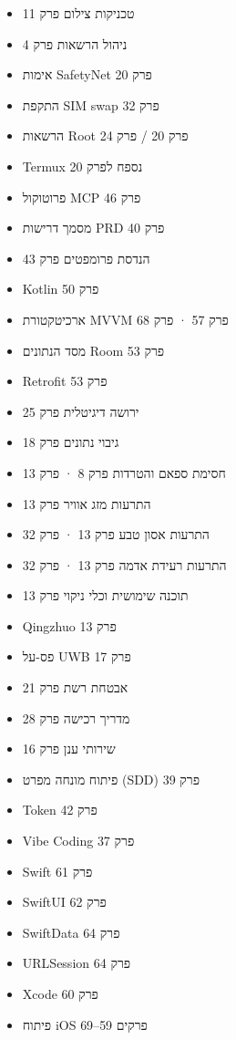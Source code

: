 
\begin{itemize}
  \item טכניקות צילום פרק 11
  \item ניהול הרשאות פרק 4
  \item אימות SafetyNet פרק 20
  \item התקפת SIM swap פרק 32
  \item הרשאות Root פרק 20 / פרק 24
  \item Termux נספח לפרק 20
  \item פרוטוקול MCP פרק 46
  \item מסמך דרישות PRD פרק 40
  \item הנדסת פרומפטים פרק 43
  \item Kotlin פרק 50
  \item ארכיטקטורת MVVM פרק 57 · פרק 68
  \item מסד הנתונים Room פרק 53
  \item Retrofit פרק 53
\end{itemize}


\begin{itemize}
  \item ירושה דיגיטלית פרק 25
  \item גיבוי נתונים פרק 18
  \item חסימת ספאם והטרדות פרק 8 · פרק 13
  \item התרעות מזג אוויר פרק 13
  \item התרעות אסון טבע פרק 13 · פרק 32
  \item התרעות רעידת אדמה פרק 13 · פרק 32
  \item תוכנה שימושית וכלי ניקוי פרק 13
  \item Qingzhuo פרק 13
  \item פס-על UWB פרק 17
  \item אבטחת רשת פרק 21
  \item מדריך רכישה פרק 28
  \item שירותי ענן פרק 16
  \item פיתוח מונחה מפרט (SDD) פרק 39
  \item Token פרק 42
  \item Vibe Coding פרק 37
  \item Swift פרק 61
  \item SwiftUI פרק 62
  \item SwiftData פרק 64
  \item URLSession פרק 64
  \item Xcode פרק 60
  \item פיתוח iOS פרקים 59–69
\end{itemize}

